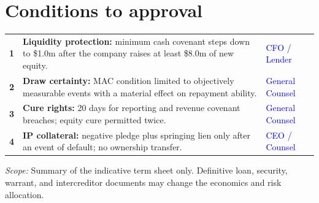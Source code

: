 \section{Conditions to approval}

\begin{tabularx}{\textwidth}{@{}C{0.27in}Y L{0.22\textwidth}@{}}
\textbf{1} & \textbf{Liquidity protection:} minimum cash covenant steps down to \$1.0m after the company raises at least \$8.0m of new equity. & \textcolor{blue}{CFO / Lender} \\
\textbf{2} & \textbf{Draw certainty:} MAC condition limited to objectively measurable events with a material effect on repayment ability. & \textcolor{blue}{General Counsel} \\
\textbf{3} & \textbf{Cure rights:} 20 days for reporting and revenue covenant breaches; equity cure permitted twice. & \textcolor{blue}{General Counsel} \\
\textbf{4} & \textbf{IP collateral:} negative pledge plus springing lien only after an event of default; no ownership transfer. & \textcolor{blue}{CEO / Counsel} \\
\end{tabularx}

\vfill
{\scriptsize\color{muted}\textit{Scope:} Summary of the indicative term sheet only. Definitive loan, security, warrant, and intercreditor documents may change the economics and risk allocation.}

\newpage


